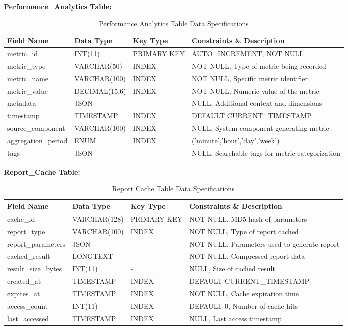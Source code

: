 \documentclass[12pt,a4paper,oneside]{book}
\begin{document}
\textbf{Performance\_Analytics Table:}
\begin{table}[H]
\centering
\caption{Performance Analytics Table Data Specifications}
\footnotesize
\begin{tabular}{|L{3cm}|L{2.5cm}|L{1.5cm}|L{5cm}|}
\hline
\textbf{Field Name} & \textbf{Data Type} & \textbf{Key Type} & \textbf{Constraints \& Description} \\
\hline
metric\_id & INT(11) & PRIMARY KEY & AUTO\_INCREMENT, NOT NULL \\
\hline
metric\_type & VARCHAR(50) & INDEX & NOT NULL, Type of metric being recorded \\
\hline
metric\_name & VARCHAR(100) & INDEX & NOT NULL, Specific metric identifier \\
\hline
metric\_value & DECIMAL(15,6) & INDEX & NOT NULL, Numeric value of the metric \\
\hline
metadata & JSON & - & NULL, Additional context and dimensions \\
\hline
timestamp & TIMESTAMP & INDEX & DEFAULT CURRENT\_TIMESTAMP \\
\hline
source\_component & VARCHAR(100) & INDEX & NULL, System component generating metric \\
\hline
aggregation\_period & ENUM & INDEX & ('minute','hour','day','week') \\
\hline
tags & JSON & - & NULL, Searchable tags for metric categorization \\
\hline
\end{tabular}
\end{table}

\textbf{Report\_Cache Table:}
\begin{table}[H]
\centering
\caption{Report Cache Table Data Specifications}
\footnotesize
\begin{tabular}{|L{3cm}|L{2.5cm}|L{1.5cm}|L{5cm}|}
\hline
\textbf{Field Name} & \textbf{Data Type} & \textbf{Key Type} & \textbf{Constraints \& Description} \\
\hline
cache\_id & VARCHAR(128) & PRIMARY KEY & NOT NULL, MD5 hash of parameters \\
\hline
report\_type & VARCHAR(100) & INDEX & NOT NULL, Type of report cached \\
\hline
report\_parameters & JSON & - & NOT NULL, Parameters used to generate report \\
\hline
cached\_result & LONGTEXT & - & NOT NULL, Compressed report data \\
\hline
result\_size\_bytes & INT(11) & - & NULL, Size of cached result \\
\hline
created\_at & TIMESTAMP & INDEX & DEFAULT CURRENT\_TIMESTAMP \\
\hline
expires\_at & TIMESTAMP & INDEX & NOT NULL, Cache expiration time \\
\hline
access\_count & INT(11) & INDEX & DEFAULT 0, Number of cache hits \\
\hline
last\_accessed & TIMESTAMP & INDEX & NULL, Last access timestamp \\
\hline
\end{tabular}
\end{table}
\end{document}
